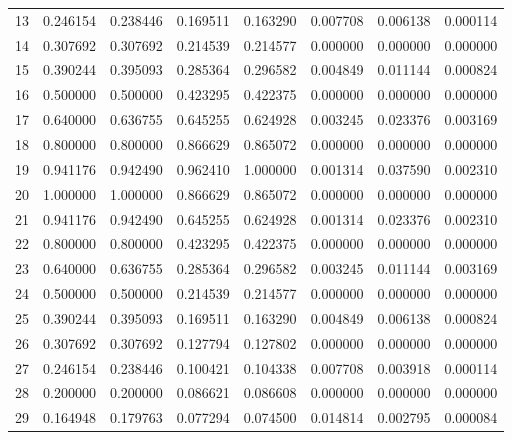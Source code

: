\documentclass{article}
\numberwithin{equation}{section}
\numberwithin{table}{section}
\begin{document}
\begin{table}[H]
{\begin{tabular}{cccccccc}
            13      & 0.246154 & 0.238446   & 0.169511 & 0.163290 & 0.007708      & 0.006138     & 0.000114     \\
            14      & 0.307692 & 0.307692   & 0.214539 & 0.214577 & 0.000000      & 0.000000     & 0.000000     \\
            15      & 0.390244 & 0.395093   & 0.285364 & 0.296582 & 0.004849      & 0.011144     & 0.000824     \\
            16      & 0.500000 & 0.500000   & 0.423295 & 0.422375 & 0.000000      & 0.000000     & 0.000000     \\
            17      & 0.640000 & 0.636755   & 0.645255 & 0.624928 & 0.003245      & 0.023376     & 0.003169     \\
            18      & 0.800000 & 0.800000   & 0.866629 & 0.865072 & 0.000000      & 0.000000     & 0.000000     \\
            19      & 0.941176 & 0.942490   & 0.962410 & 1.000000 & 0.001314      & 0.037590     & 0.002310     \\
            20      & 1.000000 & 1.000000   & 0.866629 & 0.865072 & 0.000000      & 0.000000     & 0.000000     \\
            21      & 0.941176 & 0.942490   & 0.645255 & 0.624928 & 0.001314      & 0.023376     & 0.002310     \\
            22      & 0.800000 & 0.800000   & 0.423295 & 0.422375 & 0.000000      & 0.000000     & 0.000000     \\
            23      & 0.640000 & 0.636755   & 0.285364 & 0.296582 & 0.003245      & 0.011144     & 0.003169     \\
            24      & 0.500000 & 0.500000   & 0.214539 & 0.214577 & 0.000000      & 0.000000     & 0.000000     \\
            25      & 0.390244 & 0.395093   & 0.169511 & 0.163290 & 0.004849      & 0.006138     & 0.000824     \\
            26      & 0.307692 & 0.307692   & 0.127794 & 0.127802 & 0.000000      & 0.000000     & 0.000000     \\
            27      & 0.246154 & 0.238446   & 0.100421 & 0.104338 & 0.007708      & 0.003918     & 0.000114     \\
            28      & 0.200000 & 0.200000   & 0.086621 & 0.086608 & 0.000000      & 0.000000     & 0.000000     \\
            29      & 0.164948 & 0.179763   & 0.077294 & 0.074500 & 0.014814      & 0.002795     & 0.000084     \\

\end{tabular}}
\end{table}
\end{document}
